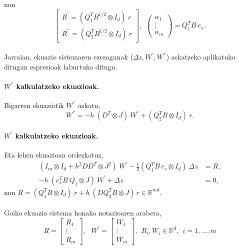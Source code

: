 non 
\begin{equation*}
\begin{bmatrix}
 R^{'}=(Q_1^{T}B^{1/2} \otimes I_d) \ r \\
 R^{''}=(Q_2^{T}B^{1/2} \otimes I_d) \ r
\end{bmatrix}, \ \
\left(
\begin{matrix}
\alpha_1 \\
\vdots \\
\alpha_m
\end{matrix}
\right)=Q_1^TB \ e_s.
\end{equation*}

\paragraph*{}Jarraian, ekuazio sistemaren ezezagunak ($\Delta z,W^{'},W^{''}$) askatzeko aplikatuko ditugun espresioak laburtuko ditugu.
\paragraph*{$W^{''}$ kalkulatzeko ekuazioak.}

Bigarren ekuaziotik $W^{''}$ askatu,
\begin{equation}
W^{''}= -h \ (D^T \otimes J) \ W^{'}+(Q_2^T B \otimes I_d) \ r.
\end{equation}

\paragraph*{$W^{'}$ kalkulatzeko ekuazioak.}

Eta lehen ekuazioan ordezkatuz,
\begin{align*}
(I_m \otimes I_d+ h^2DD^T \otimes J^2) \ W^{'}- \frac{1}{2}(Q_1^T B \ e_s \otimes I_d)\ \Delta z&=R, \\
- h \ (e_s^T B \ Q_1 \otimes J) \ W^{'} + \Delta z &=0,
\end{align*}
non $R=(Q_1^T B \otimes I_d) \ r + h \  ( D Q_2^T B \otimes J)\,  r \in \mathbb{R}^{md}.$

\paragraph*{}Goiko ekuazio sistema honako notazioaren arabera,  
\begin{equation*}
R=\begin{bmatrix}
R_1 \\
\vdots \\
R_m
\end{bmatrix}, \ \ \
W^{'}=\begin{bmatrix}
W_1 \\
\vdots \\
W_m
\end{bmatrix}, 
\ \ R_i,W_i \in \mathbb{R}^d, \ \ i=1,\dots,m  
\end{equation*}

